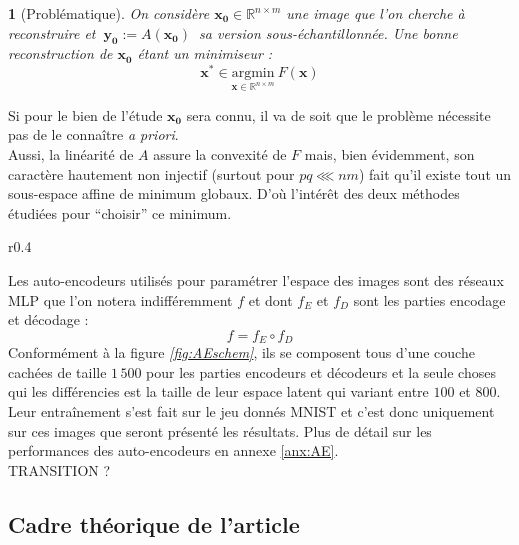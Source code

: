 \documentclass[hidelinks, french]{article} %
\newcommand{\R}{\mathbb{R}}
\newcommand{\apriori}{\textit{a priori}}
\newcommand{\argmin}[1]{\underset{#1}{\text{argmin}}}
\renewcommand{\bf}[1]{\boldsymbol{#1}}
\theoremstyle{enonce}
\theoremstyle{special}
\newtheorem{enonce}{}
\theoremstyle{rq}
\theoremstyle{exo}
\theoremstyle{demo}
\begin{document}
\begin{enonce}[Problématique]
On considère $\bf{x_0}\in\R^{n\times m}$ une image que l'on cherche à reconstruire et $\ \bf{y_0}:=A(\bf{x_0})\ $ sa version sous-échantillonnée. Une bonne reconstruction de $\bf{x_0}$ étant un minimiseur :
\begin{equation}\label{eq:probleme}
\bf{x^*}\in \argmin{\bf{x}\in\R^{n\times m}}\ F(\bf{x})\end{equation}\end{enonce}

Si pour le bien de l'étude $\bf{x_0}$ sera connu, il va de soit que le problème nécessite pas de le connaître \apriori.
\\
Aussi, la linéarité de $A$ assure la convexité de $F$ mais, bien évidemment, son caractère hautement non injectif (surtout pour $pq\lll nm$) fait qu'il existe tout un sous-espace affine de minimum globaux. D'où l'intérêt des deux méthodes étudiées pour ``choisir'' ce minimum.
\\

\begin{wrapfigure}{r}{0.4\textwidth}%
    \caption{Schéma des auto-encodeurs  $f$ avec $d=100,\ 200,\ 400,\ 800$}
    \label{fig:AEschem}
\end{wrapfigure}

Les auto-encodeurs utilisés pour paramétrer l'espace des images sont des réseaux MLP que l'on notera indifféremment $f$ et dont $f_E$ et $f_D$ sont les parties encodage et décodage :
\[f = f_E\circ f_D\]
Conformément à la figure \textit{\ref{fig:AEschem}}, ils se composent tous d'une couche cachées de taille $1\,500$ pour les parties encodeurs et décodeurs et la seule choses qui les différencies est la taille de leur espace latent qui variant entre $100$ et $800$. Leur entraînement s'est fait sur le jeu donnés MNIST et c'est donc uniquement sur ces images que seront présenté les résultats. Plus de détail sur les performances des auto-encodeurs en annexe \ref{anx:AE}. 
\\ 

TRANSITION ?
\\




\subsection{Cadre théorique de l'article}\label{sec:article1/2}
\end{document}
